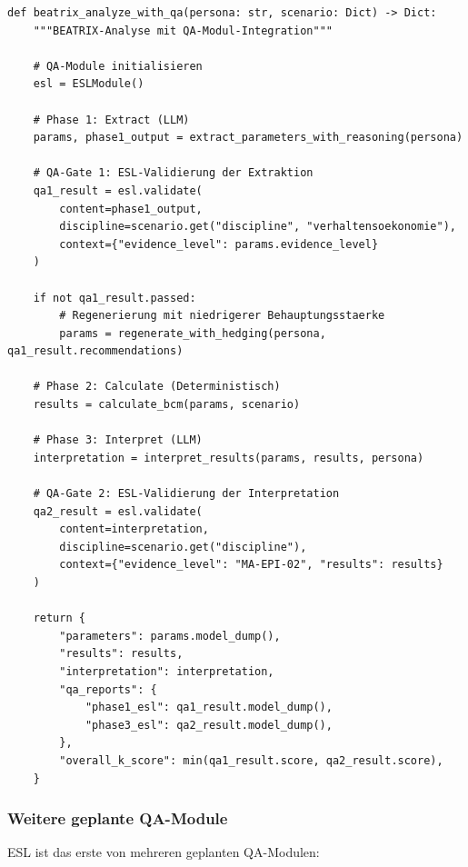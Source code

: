 \begin{lstlisting}[caption={BEATRIX Pipeline mit ESL-Integration}]
def beatrix_analyze_with_qa(persona: str, scenario: Dict) -> Dict:
    """BEATRIX-Analyse mit QA-Modul-Integration"""

    # QA-Module initialisieren
    esl = ESLModule()

    # Phase 1: Extract (LLM)
    params, phase1_output = extract_parameters_with_reasoning(persona)

    # QA-Gate 1: ESL-Validierung der Extraktion
    qa1_result = esl.validate(
        content=phase1_output,
        discipline=scenario.get("discipline", "verhaltensoekonomie"),
        context={"evidence_level": params.evidence_level}
    )

    if not qa1_result.passed:
        # Regenerierung mit niedrigerer Behauptungsstaerke
        params = regenerate_with_hedging(persona, qa1_result.recommendations)

    # Phase 2: Calculate (Deterministisch)
    results = calculate_bcm(params, scenario)

    # Phase 3: Interpret (LLM)
    interpretation = interpret_results(params, results, persona)

    # QA-Gate 2: ESL-Validierung der Interpretation
    qa2_result = esl.validate(
        content=interpretation,
        discipline=scenario.get("discipline"),
        context={"evidence_level": "MA-EPI-02", "results": results}
    )

    return {
        "parameters": params.model_dump(),
        "results": results,
        "interpretation": interpretation,
        "qa_reports": {
            "phase1_esl": qa1_result.model_dump(),
            "phase3_esl": qa2_result.model_dump(),
        },
        "overall_k_score": min(qa1_result.score, qa2_result.score),
    }
\end{lstlisting}

\subsubsection{Weitere geplante QA-Module}

ESL ist das erste von mehreren geplanten QA-Modulen:

